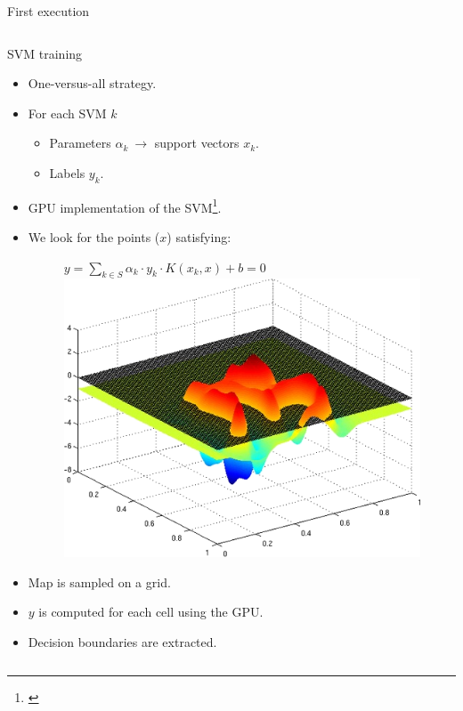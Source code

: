 \begin{frame}{First execution}
\begin{columns}
\begin{overlayarea}{\textwidth}{\textheight}
{\begin{figure}
	\end{figure}
      }
       {
	\begin{block}{SVM training}
	  \begin{itemize}
	    \item One-versus-all strategy.
	    \item For each SVM $k$
	    \begin{itemize}
	      \item Parameters $\alpha_k ~ \rightarrow$  support vectors $x_k$.
	      \item Labels $y_k$.
	    \end{itemize}
	    \item GPU implementation of the SVM\footnote{\cite{athanasopoulos2011gpu}}.
	  \end{itemize}
	\end{block}
      }
     {
	\begin{block}{}
	\footnotesize
	  \begin{itemize}
	    \item We look for the points ($x$) satisfying:
	    \begin{figure}
	      $y = \sum \limits_{k \in S} \alpha_k \cdot y_k \cdot  K(x_k, x) + b = 0$
	      \includegraphics[height=0.4\textheight]{figure2}
	    \end{figure}
	    \item Map is sampled on a grid.
	    \item $y$ is computed for each cell using the GPU.
	    \item Decision boundaries are extracted.

\end{itemize}
\end{block}}
\end{overlayarea}
\end{columns}
\end{frame}
